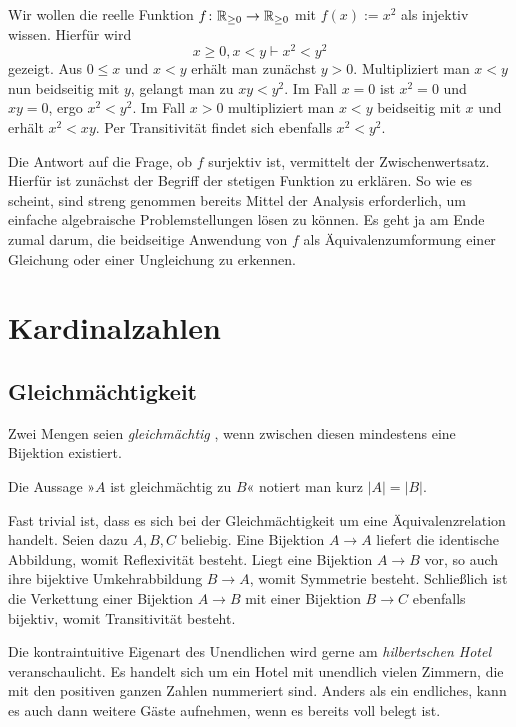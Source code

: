 \noindent
{} Wir wollen die reelle Funktion $f\colon\mathbb R_{\ge 0}\to\mathbb R_{\ge 0}$
mit $f(x):=x^2$ als injektiv wissen. Hierfür wird
\[x\ge 0,x<y\vdash x^2<y^2\]
gezeigt. Aus $0\le x$ und $x<y$ erhält man zunächst $y>0$. Multipliziert man
$x<y$ nun beidseitig mit $y$, gelangt man zu $xy<y^2$. Im Fall $x=0$ ist
$x^2=0$ und $xy=0$, ergo $x^2<y^2$. Im Fall $x>0$ multipliziert man
$x<y$ beidseitig mit $x$ und erhält $x^2<xy$. Per Transitivität
findet sich ebenfalls $x^2<y^2$.

Die Antwort auf die Frage, ob $f$ surjektiv ist, vermittelt der
Zwischenwertsatz. Hierfür ist zunächst der Begriff der stetigen
Funktion zu erklären. So wie es scheint, sind streng genommen bereits
Mittel der Analysis erforderlich, um einfache algebraische
Problemstellungen lösen zu können. Es geht ja am Ende zumal darum, die
beidseitige Anwendung von $f$ als Äquivalenzumformung einer
Gleichung oder einer Ungleichung zu erkennen.

\newpage
\section{Kardinalzahlen}

\subsection{Gleichmächtigkeit}

\begin{Definition}[Gleichmächtigkeit]\newlinefirst
Zwei Mengen seien \emph{gleichmächtig}%
, wenn zwischen diesen
mindestens eine Bijektion existiert.
\end{Definition}
Die Aussage »$A$ ist gleichmächtig zu $B$« notiert man kurz $|A|=|B|$.

Fast trivial ist, dass es sich bei der Gleichmächtigkeit um eine
Äquivalenzrelation handelt. Seien dazu $A,B,C$ beliebig. Eine Bijektion
$A\to A$ liefert die identische Abbildung, womit Reflexivität besteht.
Liegt eine Bijektion $A\to B$ vor, so auch ihre bijektive Umkehrabbildung
$B\to A$, womit Symmetrie besteht. Schließlich ist die Verkettung einer
Bijektion $A\to B$ mit einer Bijektion $B\to C$ ebenfalls bijektiv, womit
Transitivität besteht.

Die kontraintuitive Eigenart des Unendlichen wird gerne am
\emph{hilbertschen Hotel} veranschaulicht. Es
handelt sich um ein Hotel mit unendlich vielen Zimmern, die mit den
positiven ganzen Zahlen nummeriert sind. Anders als ein endliches, kann
es auch dann weitere Gäste aufnehmen, wenn es bereits voll belegt ist.


